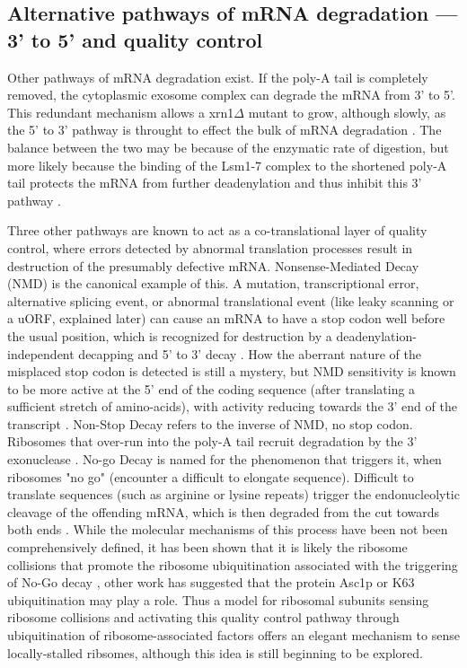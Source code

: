 \subsection{Alternative pathways of mRNA degradation ---
3' to 5' and quality control}

Other pathways
of mRNA degradation exist. If the poly-A tail is completely removed,
the cytoplasmic exosome complex can degrade the mRNA from 3' to 5'.
This redundant mechanism allows a xrn1$\Delta$ mutant to grow, although
slowly, as the 5' to 3' pathway is throught to effect the bulk of mRNA
degradation \parencite{parker2012rna}. 
The balance between the two may be because
of the enzymatic rate of digestion, but more likely because the
binding of the Lsm1-7 complex to the shortened poly-A tail protects
the mRNA from further deadenylation and thus inhibit this 3' pathway
\parencite{tharun2009lsm1}.

Three other pathways are known to act as a
co-translational layer of quality control, where errors detected by
abnormal translation processes result in destruction of the presumably
defective mRNA. Nonsense-Mediated Decay (NMD) is the canonical example
of this. A mutation, transcriptional error, alternative splicing
event, or abnormal translational event (like leaky scanning or a uORF,
explained later) can cause an mRNA to have a stop codon well before
the usual position, which is recognized for destruction by a
deadenylation-independent decapping and 5' to 3' decay 
\parencite{muhlrad1994premature}. 
How the aberrant nature of the misplaced stop codon is
detected is still a mystery, but NMD sensitivity is known to be
more active at the 5' end of the coding sequence (after translating
a sufficient stretch of amino-acids), with activity reducing
towards the 3' end of the transcript
\parencite{losson1979interference}. 
Non-Stop Decay refers to the inverse of
NMD, no stop codon. Ribosomes that over-run into the poly-A tail
recruit degradation by the 3' exonuclease 
\parencite{schmid2008exosome}. No-go Decay is
named for the phenomenon that triggers it, when ribosomes "no go"
(encounter a difficult to elongate sequence).
Difficult to translate sequences (such as arginine or lysine repeats) 
trigger the
endonucleolytic cleavage of the offending mRNA, which is then degraded
from the cut towards both ends 
\parencite{doma2006endonucleolytic}. While the molecular mechanisms of
this process have been not been comprehensively defined, 
it has been shown that it is likely the ribosome collisions that
promote the ribosome ubiquitination associated with the triggering of
No-Go decay \parencite{simms2017ribosome}, 
other work has suggested that the
protein Asc1p \parencite{ikeuchi2016ribosome} 
or K63 ubiquitination \parencite{saito2015inhibiting}
may play a role.
Thus a model for ribosomal subunits sensing ribosome collisions 
and activating this quality control pathway through ubiquitination
of ribosome-associated factors offers an elegant mechanism to sense
locally-stalled ribsomes, although this idea is still beginning to be
explored.

